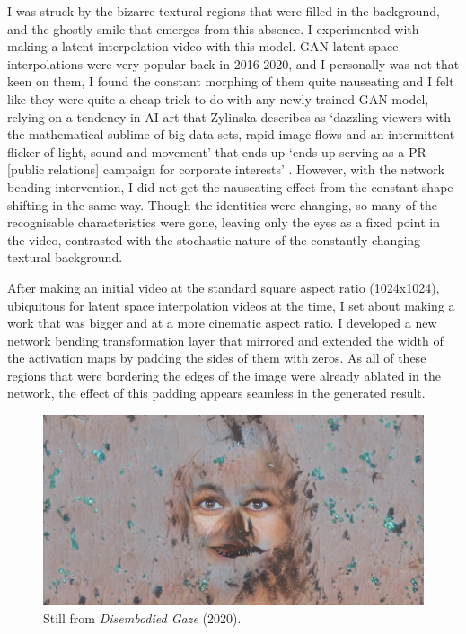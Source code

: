 I was struck by the bizarre textural regions that were filled in the background, and the ghostly smile that emerges from this absence. 
I experimented with making a latent interpolation video with this model. GAN latent space interpolations were very popular back in 2016-2020, and I personally was not that keen on them, I found the constant morphing of them quite nauseating and I felt like they were quite a cheap trick to do with any newly trained GAN model, relying on a tendency in AI art that Zylinska describes as `dazzling viewers with the mathematical sublime of big data sets, rapid image flows and an intermittent flicker of light, sound and movement' that ends up `ends up serving as a PR [public relations] campaign for corporate interests'  \citeyearpar{zylinska2020ai}. 
However, with the network bending intervention, I did not get the nauseating effect from the constant shape-shifting in the same way. 
Though the identities were changing, so many of the recognisable characteristics were gone, leaving only the eyes as a fixed point in the video, contrasted with the stochastic nature of the constantly changing textural background. 

After making an initial video at the standard square aspect ratio (1024x1024), ubiquitous for latent space interpolation videos at the time, I set about making a work that was bigger and at a more cinematic aspect ratio. 
I developed a new network bending transformation layer that mirrored and extended the width of the activation maps by padding the sides of them with zeros.
As all of these regions that were bordering the edges of the image were already ablated in the network, the effect of this padding appears seamless in the generated result. 

\begin{figure}[!htb]
    \centering
    \captionsetup{justification=centering}
    \includegraphics[width=1\textwidth]{figures/c7_impact/disembodied_gaze.png}
    \caption{Still from \textit{Disembodied Gaze} (2020).}
    \label{fig:c7:disembodied-gaze-wide}
\end{figure}

